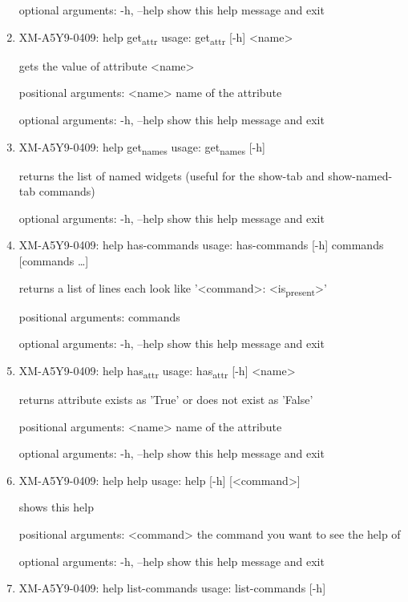 \documentclass[11pt]{article}
\begin{document}
\begin{enumerate}
optional arguments:
  -h, --help  show this help message and exit

\item XM-A5Y9-0409: help get\textsubscript{attr}
\label{sec:org059977d}
usage: get\textsubscript{attr} [-h] <name>

gets the value of attribute <name>

positional arguments:
  <name>      name of the attribute

optional arguments:
  -h, --help  show this help message and exit

\item XM-A5Y9-0409: help get\textsubscript{names}
\label{sec:org55ba829}
usage: get\textsubscript{names} [-h]

returns the list of named widgets (useful for the show-tab and show-named-tab
commands)

optional arguments:
  -h, --help  show this help message and exit

\item XM-A5Y9-0409: help has-commands
\label{sec:org4662e82}
usage: has-commands [-h] commands [commands \ldots{}]

returns a list of lines each look like '<command>: <is\textsubscript{present}>'

positional arguments:
  commands

optional arguments:
  -h, --help  show this help message and exit

\item XM-A5Y9-0409: help has\textsubscript{attr}
\label{sec:orgc3df18a}
usage: has\textsubscript{attr} [-h] <name>

returns attribute exists as 'True' or does not exist as 'False'

positional arguments:
  <name>      name of the attribute

optional arguments:
  -h, --help  show this help message and exit

\item XM-A5Y9-0409: help help
\label{sec:orgd10340e}
usage: help [-h] [<command>]

shows this help

positional arguments:
  <command>   the command you want to see the help of

optional arguments:
  -h, --help  show this help message and exit

\item XM-A5Y9-0409: help list-commands
\label{sec:orgd5c2b25}
usage: list-commands [-h]


\end{enumerate}
\end{document}
